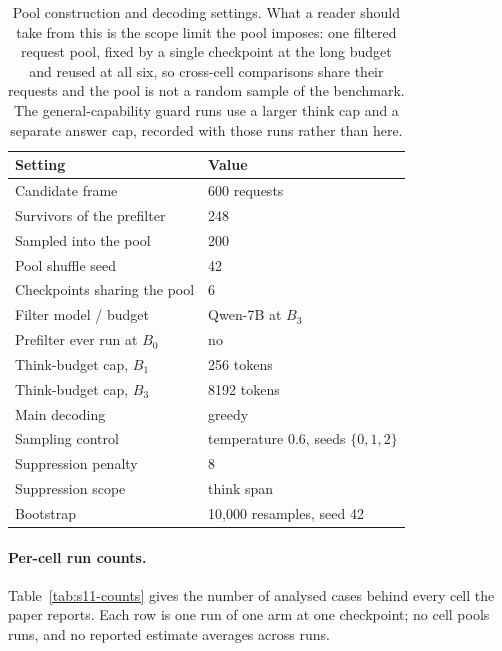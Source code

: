 \documentclass[letterpaper]{article}
\begin{document}
\begin{table}[t]
\centering
\small
\begin{tabular}{@{}ll@{}}
\toprule
Setting & Value \\
\midrule
Candidate frame                 & 600 requests \\
Survivors of the prefilter      & 248 \\
Sampled into the pool           & 200 \\
Pool shuffle seed               & 42 \\
Checkpoints sharing the pool    & 6 \\
Filter model / budget           & Qwen-7B at \(B_3\) \\
Prefilter ever run at \(B_0\)   & no \\
\addlinespace
Think-budget cap, \(B_1\)       & 256 tokens \\
Think-budget cap, \(B_3\)       & 8192 tokens \\
Main decoding                   & greedy \\
Sampling control                & temperature \(0.6\), seeds \(\{0,1,2\}\) \\
Suppression penalty             & 8 \\
Suppression scope               & think span \\
Bootstrap                       & 10{,}000 resamples, seed 42 \\
\bottomrule
\end{tabular}
\caption{Pool construction and decoding settings.  What a reader should take
from this is the scope limit the pool imposes: one filtered request pool, fixed
by a single checkpoint at the long budget and reused at all six, so cross-cell
comparisons share their requests and the pool is not a random sample of the
benchmark.  The general-capability guard runs use a larger think cap and a
separate answer cap, recorded with those runs rather than here.}
\label{tab:s11-decode}
\end{table}

\paragraph{Per-cell run counts.}
Table~\ref{tab:s11-counts} gives the number of analysed cases behind every cell
the paper reports.  Each row is one run of one arm at one checkpoint; no cell
pools runs, and no reported estimate averages across runs.
\end{document}
